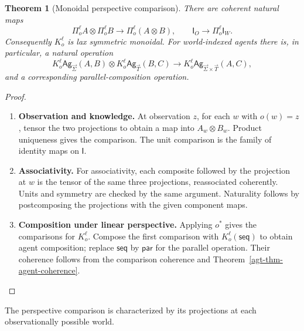 \documentclass[11pt,a4paper]{article}
\numberwithin{equation}{section}
\newtheorem{theorem}{Theorem}[section]
\theoremstyle{definition}
\theoremstyle{remark}
\theoremstyle{plain}
\providecommand{\Ag}{\mathsf{Ag}}
\providecommand{\sig}{\vec{\Sigma}}
\providecommand{\taus}{\vec{T}}
\providecommand{\I}{\mathsf{I}}
\begin{document}
\begin{theorem}[Monoidal perspective comparison]
\label{agt-thm-perspective-monoidal}
There are coherent natural maps
\[
 \Pi_o^\ell A\otimes\Pi_o^\ell B
 \longrightarrow\Pi_o^\ell(A\otimes B),
 \qquad\I_O\longrightarrow\Pi_o^\ell\I_W.
\]
Consequently $K_o^\ell$ is lax symmetric monoidal. For world-indexed
agents there is, in particular, a natural operation
\[
 K_o^\ell\Ag_{\sig}(A,B)\otimes
 K_o^\ell\Ag_{\taus}(B,C)
 \longrightarrow
 K_o^\ell\Ag_{\sig\times\taus}(A,C),
\]
and a corresponding parallel-composition operation.
\end{theorem}
\begin{proof}
\leavevmode
\begin{enumerate}[label=\textup{(\arabic*)},leftmargin=*,itemsep=4pt,topsep=3pt]
  \item \textbf{Observation and knowledge.} At observation $z$, for each $w$ with $o(w)=z$, tensor the two projections
to obtain a map into $A_w\otimes B_w$. Product uniqueness gives the
comparison. The unit comparison is the family of identity maps on $\I$.
  \item \textbf{Associativity.} For associativity, each composite followed by the projection at $w$ is
the tensor of the same three projections, reassociated coherently. Units
and symmetry are checked by the same argument. Naturality follows by
postcomposing the projections with the given component maps.
  \item \textbf{Composition under linear perspective.} Applying $o^*$ gives the comparisons for $K_o^\ell$. Compose the first
comparison with $K_o^\ell(\mathsf{seq})$ to obtain agent composition;
replace $\mathsf{seq}$ by $\mathsf{par}$ for the parallel operation. Their coherence follows from the comparison coherence and
Theorem~\ref{agt-thm-agent-coherence}.
\end{enumerate}
\end{proof}

\noindent The perspective comparison is characterized by its projections at each observationally possible world.
\begin{center}
\end{center}
\end{document}

